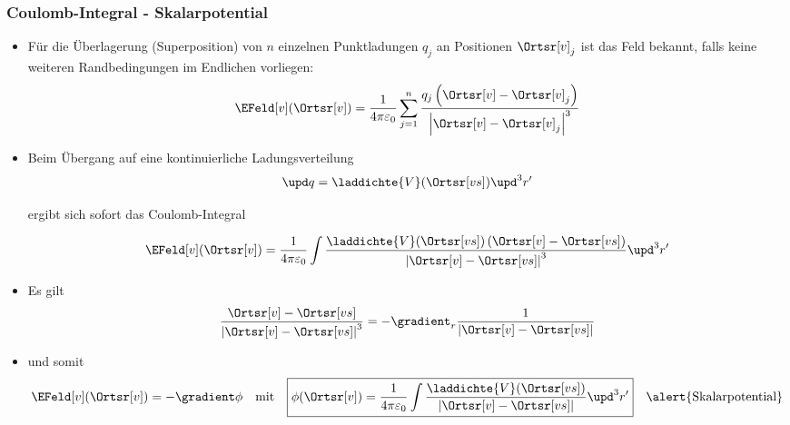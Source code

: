     \begin{frame}
      \frametitle{Coulomb-Integral - Skalarpotential}
      \begin{itemize}[<+->]
        \item Für die \alert{Überlagerung} (Superposition) von $n$
          einzelnen Punktladungen $q_j$ an Positionen $\Ortsr[v]_j$ ist
          das Feld bekannt, falls keine weiteren
          \alert{Randbedingungen im Endlichen} vorliegen:
          $$
          \EFeld[v] (\Ortsr[v])= \frac{1}{4\pi\varepsilon_0} \sum_{j=1}^n \frac{q_j\left(\Ortsr[v]-\Ortsr[v]_j\right)}{\left|\Ortsr[v]-\Ortsr[v]_j\right|^3}
          $$
          \item Beim Übergang auf eine \alert{kontinuierliche
              Ladungsverteilung}
            $$
            \upd q =
            \laddichte{V}(\Ortsr[vs])\upd^3r'$$

            ergibt sich sofort das \alert{Coulomb-Integral}

            $$
          \EFeld[v] (\Ortsr[v])= \frac{1}{4\pi\varepsilon_0}
          \int
          \frac{\laddichte{V}(\Ortsr[vs])\left(\Ortsr[v]-\Ortsr[vs]\right)}{\left|\Ortsr[v]-\Ortsr[vs]\right|^3
          } \upd^3r'
          $$
        \item Es gilt
          $$
          \frac{\Ortsr[v]-\Ortsr[vs]}{\left|\Ortsr[v]-\Ortsr[vs]\right|^3}
            = -\gradient_r \frac{1}{\left|\Ortsr[v]-\Ortsr[vs]\right|}
            $$
          \item und somit
            $$
            \EFeld[v](\Ortsr[v]) = -\gradient \phi \quad\text{mit}\quad
            \boxed{\phi(\Ortsr[v]) = \frac{1}{4\pi\varepsilon_0}
          \int
          \frac{\laddichte{V}(\Ortsr[vs])}{\left|\Ortsr[v]-\Ortsr[vs]\right|} \upd^3r'} \quad\alert{\text{Skalarpotential}}
            $$
        \end{itemize}
      \end{frame}
    
